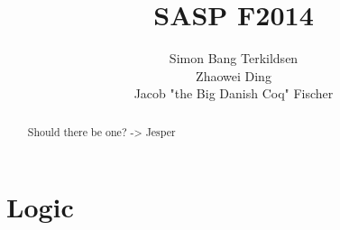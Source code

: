 \documentclass[citeauthoryear]{llncs} %
\title{SASP F2014}
\author{Simon Bang Terkildsen\\Zhaowei Ding\\Jacob "the Big Danish Coq" Fischer}
\institute{IT University of Copenhagen}
\theoremstyle{definition}
\theoremstyle{notation}
\begin{document}
\maketitle

\begin{abstract}
Should there be one? -> Jesper
\end{abstract}







\section{Logic}








\end{document}
